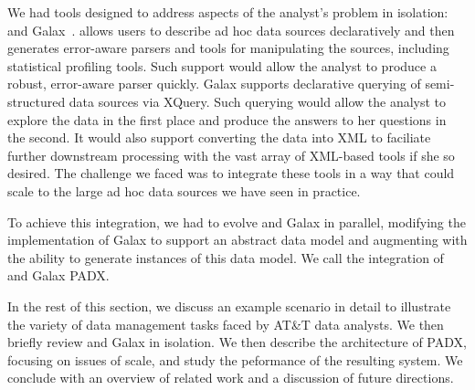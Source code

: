 
We had tools designed to address aspects of the analyst's problem in
isolation: \pads{}~\cite{pldi05} and Galax~\cite{galax}.  \pads{} allows
users to describe ad hoc data sources declaratively and then generates
error-aware parsers and tools for manipulating the sources, including
statistical profiling tools.  Such support would allow the analyst 
to produce a robust, error-aware parser quickly.
Galax supports declarative querying of
semi-structured data sources via XQuery.  Such querying would allow
the analyst to explore the data in the first place and produce the
answers to her questions in the second.  It would also support
converting the data into XML to faciliate further downstream
processing with the vast array of XML-based tools if she so desired.
The challenge we faced was to integrate these tools in a way that
could scale to the large ad hoc data sources we have seen in practice.  

To achieve this integration, we had to evolve \pads{} and Galax in
parallel, modifying the implementation of Galax to support an abstract
data model and augmenting \pads{} with the ability to generate
instances of this data model.  We call the integration of \pads{} and
Galax PADX. 


In the rest of this section, we discuss an example scenario in detail
to illustrate the variety of data management tasks faced by AT\&T data
analysts. We then briefly review \pads{} and Galax in isolation.  We then
describe the architecture of PADX, focusing on issues of scale, and
study the peformance of the resulting system.  We conclude with an
overview of related work and a discussion of future directions.



